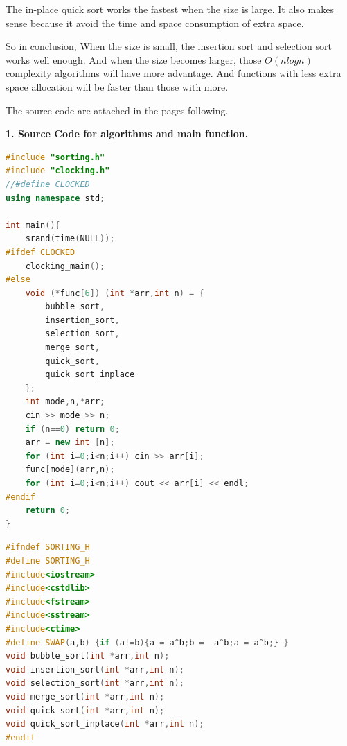\documentclass{article}
\begin{document}
The in-place quick sort works the fastest when the size is large. It also makes sense because it avoid the time and space consumption of extra space.

So in conclusion, When the size is small, the insertion sort and selection sort works well enough. And when the size becomes larger, those $O(nlogn)$ complexity algorithms will have more advantage. And functions with less extra space allocation will be faster than those with more.

The source code are attached in the pages following.

\newpage

{\bf 1. Source Code for algorithms and main function.}
\begin{lstlisting}[title=main.cpp,language=C++]
#include "sorting.h"
#include "clocking.h"
//#define CLOCKED
using namespace std;

int main(){
    srand(time(NULL));
#ifdef CLOCKED
    clocking_main();
#else
    void (*func[6]) (int *arr,int n) = {
        bubble_sort,
        insertion_sort,
        selection_sort,
        merge_sort,
        quick_sort,
        quick_sort_inplace
    };
    int mode,n,*arr;
    cin >> mode >> n;
    if (n==0) return 0;
    arr = new int [n];
    for (int i=0;i<n;i++) cin >> arr[i];
    func[mode](arr,n);
    for (int i=0;i<n;i++) cout << arr[i] << endl;
#endif
    return 0;
}    
\end{lstlisting}
\begin{lstlisting}[title=sorting.h,language=C++]
#ifndef SORTING_H
#define SORTING_H
#include<iostream>
#include<cstdlib>
#include<fstream>
#include<sstream>
#include<ctime>
#define SWAP(a,b) {if (a!=b){a = a^b;b =  a^b;a = a^b;} }
void bubble_sort(int *arr,int n);
void insertion_sort(int *arr,int n);
void selection_sort(int *arr,int n);
void merge_sort(int *arr,int n);
void quick_sort(int *arr,int n);
void quick_sort_inplace(int *arr,int n);
#endif
\end{lstlisting}
\end{document}
